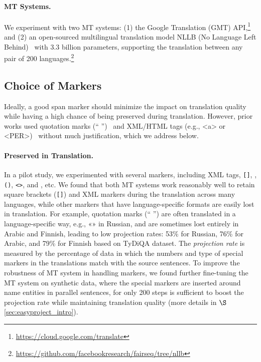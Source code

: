 \documentclass[11pt,dvipsnames]{article}
\begin{document}
\paragraph{MT Systems.} We experiment with two MT systems: (1) the Google Translation (GMT) API,\footnote{\url{https://cloud.google.com/translate}} and (2) an open-sourced multilingual  translation model NLLB (No Language Left Behind)~\citep{nllb2022} with 3.3 billion parameters, supporting the translation between any pair of 200 languages.\footnote{\url{https://github.com/facebookresearch/fairseq/tree/nllb}} 






\subsection{Choice of Markers}
\label{sec:choice-of-markers}
Ideally, a good span marker should minimize the impact on translation quality while having a high chance of being preserved during translation. However, prior works used quotation marks (`` '')~\citep{lee-etal-2018-semi,lewis2020mlqa} and XML/HTML tags (e.g., <a> or <PER>)~\citep{hu2020xtreme, ahmad2021gate} without much justification, which we address below.






\paragraph{Preserved in Translation.}  In a pilot study, we experimented with several markers, including XML tags, \texttt{[]}, , \texttt{()}, \texttt{<>}, and \text{\{\}}, etc. We found that both MT systems work reasonably well to retain square brackets (\texttt{[]}) and XML markers during the translation across many languages, while other markers that have language-specific formats are easily lost in translation.  For example, quotation marks (`` '') are often translated in a language-specific way, e.g., «» in Russian, and  are sometimes  lost entirely in Arabic and Finnish, leading to low projection rates: 53\% for Russian, 76\% for Arabic, and 79\% for Finnish based on TyDiQA dataset. The \textit{projection rate} is measured by the percentage of data in which the numbers and type of special  markers in the translations match with the source sentences. To improve the robustness of MT system in handling  markers, we found  further fine-tuning the MT system on synthetic data, where the special markers are inserted around  name entities in parallel sentences,  for only 200 steps is sufficient to boost the projection rate while maintaining translation quality (more details in $\S$\ref{sec:easyproject_intro}).
\end{document}

